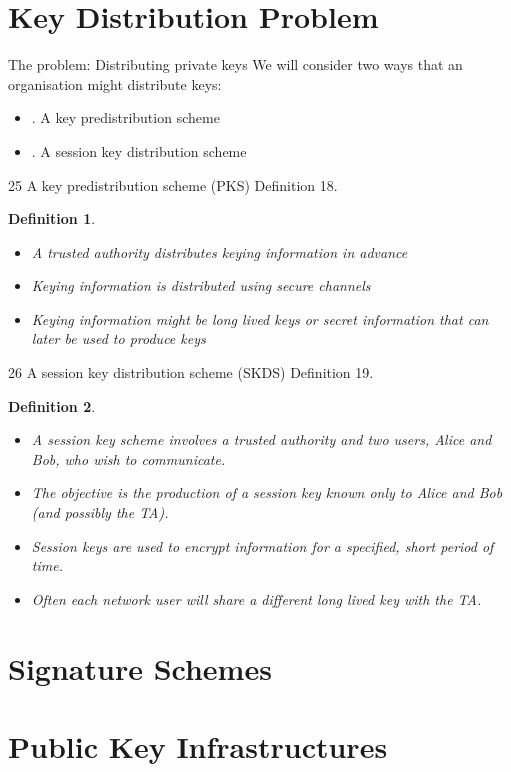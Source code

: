 \documentclass{article}
\theoremstyle{quest}
\newtheorem*{definition}{Definition}
\begin{document}
\tableofcontents

\pagebreak


\pagebreak


\pagebreak


\pagebreak
\section{Key Distribution Problem}
The problem: Distributing private keys
We will consider two ways that an organisation might distribute keys:
\begin{itemize}
    \item. A key predistribution scheme
    \item. A session key distribution scheme
\end{itemize}
25 A key predistribution scheme (PKS)
Definition 18.
\begin{definition}
    \begin{itemize}
        \item A trusted authority distributes keying information in advance
        \item Keying information is distributed using secure channels
        \item Keying information might be long lived keys or secret information that can later be used to produce keys
    \end{itemize}
\end{definition}
26 A session key distribution scheme (SKDS) Definition 19.
\begin{definition}
    \begin{itemize}
        \item A session key scheme involves a trusted authority and two users, Alice and Bob, who wish to communicate.
        \item The objective is the production of a session key known only to Alice and Bob (and possibly the TA).
        \item Session keys are used to encrypt information for a specified, short period of time.
        \item Often each network user will share a different long lived key with the TA.
    \end{itemize}
\end{definition}

\pagebreak


\pagebreak
\section{Signature Schemes}
\pagebreak
\section{Public Key Infrastructures}
\end{document}
